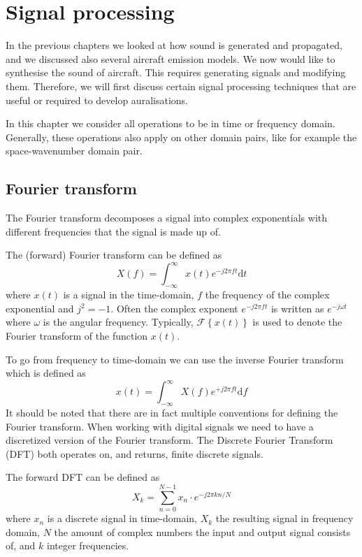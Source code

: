 \section{Signal processing}
In the previous chapters we looked at how sound is generated and propagated, and
we discussed also several aircraft emission models.
We now would like to synthesise the sound of aircraft. This requires generating
signals and modifying them. Therefore, we will first discuss certain signal
processing techniques that are useful or required to develop auralisations.

In this chapter we consider all operations to be in time or frequency
domain. Generally, these operations also apply on other domain pairs, like for
example the space-wavenumber domain pair.


\newpage
\subsection{Fourier transform}
The Fourier transform decomposes a signal into complex exponentials with
different frequencies that the signal is made up of.

The (forward) Fourier transform can be defined as
\begin{equation}
 X(f) = \int_{-\infty}^{\infty} x(t) e^{-j 2 \pi f t} \mathrm{d} t
\end{equation}
where $x(t)$ is a signal in the time-domain, $f$ the frequency of the complex exponential and $j^2=-1$.
Often the complex exponent $e^{-j 2 \pi f t}$ is written as $e^{-j \omega t}$ where $\omega$ is the angular frequency.
Typically, $\mathcal{F} \left\{ x(t) \right\}$ is used to denote the Fourier transform of the function $x(t)$.

To go from frequency to time-domain we can use the inverse Fourier transform which is defined as
\begin{equation}
 x(t) = \int_{-\infty}^{\infty} X(f) e^{+j 2 \pi f t} \mathrm{d} f
\end{equation}
It should be noted that there are in fact multiple conventions for defining the Fourier transform.
When working with digital signals we need to have a discretized version of the
Fourier transform. The Discrete Fourier Transform (DFT) both operates on, and
returns, finite discrete signals.

The forward DFT can be defined as
\begin{equation}
 X_k = \sum_{n=0}^{N-1} x_n \cdot e^{-j 2\pi k n / N}
\end{equation}
where $x_n$ is a discrete signal in time-domain, $X_k$ the resulting signal in
frequency domain, $N$ the amount of complex numbers the input and output signal
consists of, and $k$ integer frequencies.

